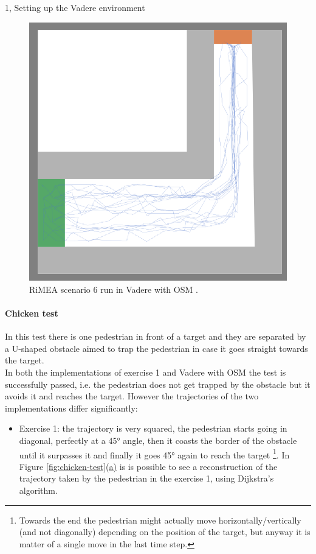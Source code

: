 \documentclass[10pt,a4paper]{article}
\begin{document}
\begin{task}{1, Setting up the Vadere environment}
\begin{figure}[H]
    \centering
    \includegraphics[scale=0.5]{images/rimea6-osm.png}
    \caption{RiMEA scenario 6 run in Vadere with OSM \cite{osm, bridging-the-gap, dynamic-stride-length}.}
    \label{fig:rimea6}
\end{figure}

\paragraph{Chicken test}
In this test there is one pedestrian in front of a target and they are separated by a U-shaped obstacle aimed to trap the pedestrian in case it goes straight towards the target.\\
In both the implementations of exercise 1 and Vadere with OSM the test is successfully passed, i.e. the pedestrian does not get trapped by the obstacle but it avoids it and reaches the target.
However the trajectories of the two implementations differ significantly:
\begin{itemize}
    \item Exercise 1: the trajectory is very squared, the pedestrian starts going in diagonal, perfectly at a 45° angle, then it coasts the border of the obstacle until it surpasses it and finally it goes 45° again to reach the target
    \footnote{Towards the end the pedestrian might actually move horizontally/vertically (and not diagonally) depending on the position of the target, but anyway it is matter of a single move in the last time step.}.
    In Figure \hyperref[fig:chicken-test]{\ref{fig:chicken-test}(a)} is is possible to see a reconstruction of the trajectory taken by the pedestrian in the exercise 1, using Dijkstra's algorithm.
    

\end{itemize}
\end{task}
\end{document}
